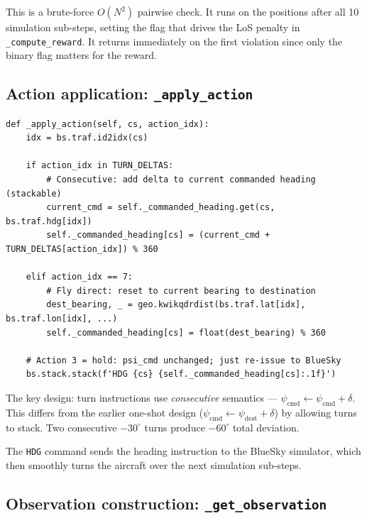 \documentclass[11pt, a4paper]{article}
\begin{document}
This is a brute-force $O(N^2)$ pairwise check.
It runs on the positions after all 10 simulation sub-steps, setting the flag that
drives the LoS penalty in \texttt{\_compute\_reward}.
It returns immediately on the first violation since only the binary flag matters
for the reward.

\subsection{Action application: \texttt{\_apply\_action}}

\begin{lstlisting}[caption={Applying a discrete action to the focus aircraft.}]
def _apply_action(self, cs, action_idx):
    idx = bs.traf.id2idx(cs)

    if action_idx in TURN_DELTAS:
        # Consecutive: add delta to current commanded heading (stackable)
        current_cmd = self._commanded_heading.get(cs, bs.traf.hdg[idx])
        self._commanded_heading[cs] = (current_cmd + TURN_DELTAS[action_idx]) % 360

    elif action_idx == 7:
        # Fly direct: reset to current bearing to destination
        dest_bearing, _ = geo.kwikqdrdist(bs.traf.lat[idx], bs.traf.lon[idx], ...)
        self._commanded_heading[cs] = float(dest_bearing) % 360

    # Action 3 = hold: psi_cmd unchanged; just re-issue to BlueSky
    bs.stack.stack(f'HDG {cs} {self._commanded_heading[cs]:.1f}')
\end{lstlisting}

The key design: turn instructions use \emph{consecutive} semantics ---
$\psi_\text{cmd} \leftarrow \psi_\text{cmd} + \delta$.
This differs from the earlier one-shot design ($\psi_\text{cmd} \leftarrow
\psi_\text{dest} + \delta$) by allowing turns to stack.
Two consecutive $-30^\circ$ turns produce $-60^\circ$ total deviation.

The \texttt{HDG} command sends the heading instruction to the BlueSky simulator,
which then smoothly turns the aircraft over the next simulation sub-steps.

\subsection{Observation construction: \texttt{\_get\_observation}}
\end{document}
